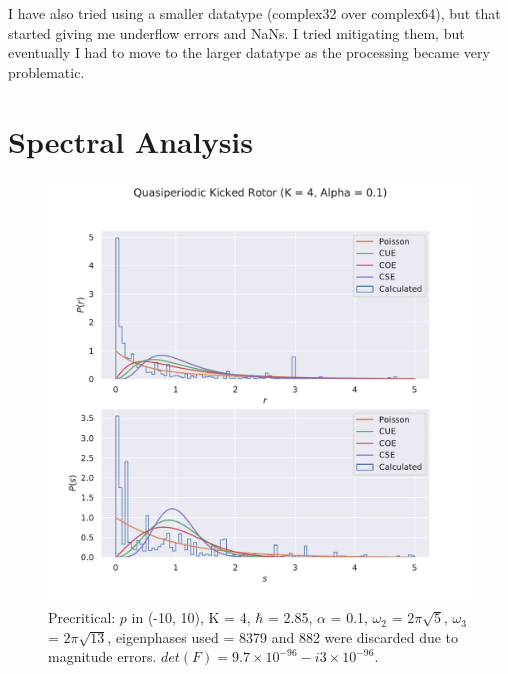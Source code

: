 \documentclass[12pt]{article}
\begin{document}
\begin{enumerate}
    I have also tried using a smaller datatype (complex32 over complex64),
    but that started giving me underflow errors and NaNs. I tried mitigating
    them, but eventually I had to move to the larger datatype as the processing
    became very problematic.
\end{enumerate}

\section{Spectral Analysis}

\begin{figure}[h]
    \includegraphics[width=\linewidth]{quasiperiodic_kickedrotor_spectrum_N10_precritical.pdf}
    \caption{Precritical: $p$ in (-10, 10), K = 4, $\hbar$ = 2.85, $\alpha$ = 0.1,
    $\omega_2$ = $2\pi\sqrt{5}$, $\omega_3$ = $2\pi\sqrt{13}$, eigenphases
    used = 8379 and 882 were discarded due to magnitude errors. $det(F) = 9.7
    \times 10^{-96} - i 3 \times 10^{-96}$.}
    \centering
\end{figure}
\end{document}
